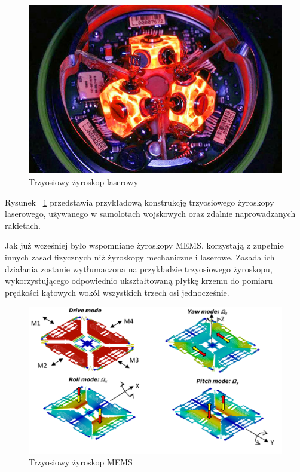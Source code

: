 \begin{figure}[H]
	\centering
	\includegraphics[scale=0.4]{Pictures/3d_laser_ring_gyro.jpg}
        \caption[Trzyosiowy żyroskop laserowy]{Trzyosiowy żyroskop laserowy}
        \label{fig:3d_laser_ring_gyro}
\end{figure}

Rysunek ~\ref{fig:3d_laser_ring_gyro} przedstawia przykładową konstrukcję trzyosiowego żyroskopy laserowego, używanego w samolotach wojskowych oraz zdalnie naprowadzanych rakietach. 

Jak już wcześniej było wspomniane żyroskopy MEMS, korzystają z zupełnie innych zasad fizycznych niż żyroskopy mechaniczne i laserowe. Zasada ich działania zostanie wytłumaczona na przykładzie trzyosiowego żyroskopu, wykorzystującego odpowiednio ukształtowaną płytkę krzemu do pomiaru prędkości kątowych wokół wszystkich trzech osi jednocześnie.

\begin{figure}[H]
	\centering
	\includegraphics[scale=0.4]{Pictures/3d_gyro.png}
        \caption[Trzyosiowy żyroskop MEMS]{Trzyosiowy żyroskop MEMS}
        \label{fig:3d_gyro}
\end{figure}

